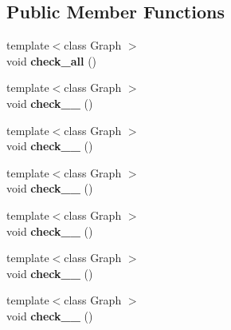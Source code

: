 \subsection*{Public Member Functions}
\begin{DoxyCompactItemize}
\item 
\mbox{\label{classsequoia_1_1unit__testing_1_1directed__embedded__init__checker_a605eed140aada957a2b2078d0756bd1a}} 
{\footnotesize template$<$class Graph $>$ }\\void {\bfseries check\+\_\+all} ()
\item 
\mbox{\label{classsequoia_1_1unit__testing_1_1directed__embedded__init__checker_a4928472f14643bdd1cf7c2122454b4bc}} 
{\footnotesize template$<$class Graph $>$ }\\void {\bfseries check\+\_\+\_} ()
\item 
\mbox{\label{classsequoia_1_1unit__testing_1_1directed__embedded__init__checker_a2984c785b57c20e70b852faa1151ba2c}} 
{\footnotesize template$<$class Graph $>$ }\\void {\bfseries check\+\_\+\_} ()
\item 
\mbox{\label{classsequoia_1_1unit__testing_1_1directed__embedded__init__checker_a8abd2aa68f5e956eb5154fb31b0f0eaf}} 
{\footnotesize template$<$class Graph $>$ }\\void {\bfseries check\+\_\+\_} ()
\item 
\mbox{\label{classsequoia_1_1unit__testing_1_1directed__embedded__init__checker_a8a2633bdb8d6487da92c3bb907d7b8c5}} 
{\footnotesize template$<$class Graph $>$ }\\void {\bfseries check\+\_\+\_} ()
\item 
\mbox{\label{classsequoia_1_1unit__testing_1_1directed__embedded__init__checker_a27272474c179d617aae1ac40da0a24c2}} 
{\footnotesize template$<$class Graph $>$ }\\void {\bfseries check\+\_\+\_} ()
\item 
\mbox{\label{classsequoia_1_1unit__testing_1_1directed__embedded__init__checker_ad2aeec52a7fb164138c5bcf2a76b30c6}} 
{\footnotesize template$<$class Graph $>$ }\\void {\bfseries check\+\_\+\_} ()
\end{DoxyCompactItemize}
